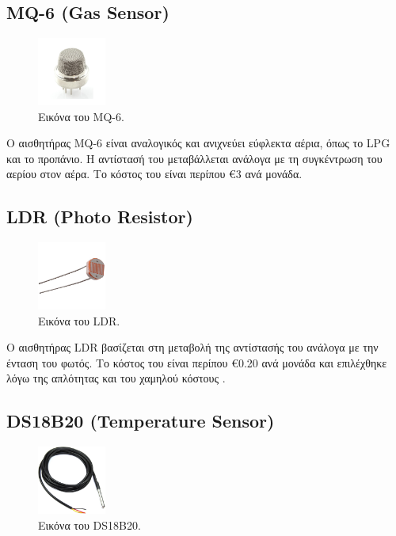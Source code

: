 \documentclass[conference]{IEEEtran}
\begin{document}
\subsection{MQ-6 (Gas Sensor)}

\begin{figure}[H]
	\centerline{\includegraphics[width=0.2\textwidth]{assets/gas}}
	\caption{Εικόνα του MQ-6.}
	\label{Εικόνα του MQ-6.}
\end{figure}

Ο αισθητήρας MQ-6 είναι αναλογικός και ανιχνεύει εύφλεκτα αέρια, όπως το LPG και το προπάνιο. Η αντίστασή του μεταβάλλεται ανάλογα με τη συγκέντρωση του αερίου στον αέρα. Το κόστος του είναι περίπου €3 ανά μονάδα. \cite{mq6}

\subsection{LDR (Photo Resistor)}

\begin{figure}[H]
	\centerline{\includegraphics[width=0.2\textwidth]{assets/light}}
	\caption{Εικόνα του LDR.}
	\label{Εικόνα του LDR.}
\end{figure}

Ο αισθητήρας LDR βασίζεται στη μεταβολή της αντίστασής του ανάλογα με την ένταση του φωτός. Το κόστος του είναι περίπου €0.20 ανά μονάδα και επιλέχθηκε λόγω της απλότητας και του χαμηλού κόστους . \cite{ldr}

\subsection{DS18B20 (Temperature Sensor)}

\begin{figure}[H]
	\centerline{\includegraphics[width=0.2\textwidth]{assets/temp}}
	\caption{Εικόνα του DS18B20.}
	\label{Εικόνα του DS18B20.}
\end{figure}
\end{document}
